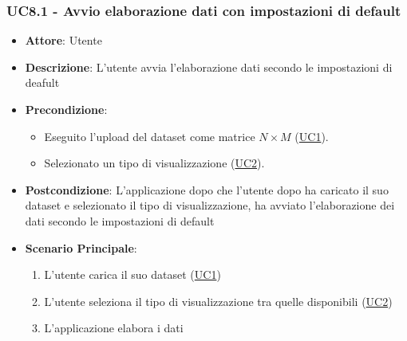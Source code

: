     \subsubsection{UC8.1 - Avvio elaborazione dati con impostazioni di default}
    \label{uc8.1}
    \begin{itemize}
    \item \textbf{Attore}: Utente
    \item \textbf{Descrizione}: L'utente avvia l'elaborazione dati secondo le impostazioni di deafult
    \item \textbf{Precondizione}: 
    \begin{itemize}
        \item Eseguito l'upload del dataset come matrice $N\times M$ (\hyperref[uc1]{UC1}).
        \item Selezionato un tipo di visualizzazione (\hyperref[uc2]{UC2}).
    \end{itemize}  
    \item \textbf{Postcondizione}: L'applicazione dopo che l'utente dopo ha caricato il suo dataset e selezionato il tipo di visualizzazione, ha avviato l'elaborazione dei dati secondo le impostazioni di default
    \item \textbf{Scenario Principale}: 
    \begin{enumerate}
        \item L'utente carica il suo dataset (\hyperref[uc1]{UC1})
        \item L'utente seleziona il tipo di visualizzazione tra quelle disponibili (\hyperref[uc2]{UC2})
        \item L'applicazione elabora i dati
    \end{enumerate}
    \end{itemize}
    
